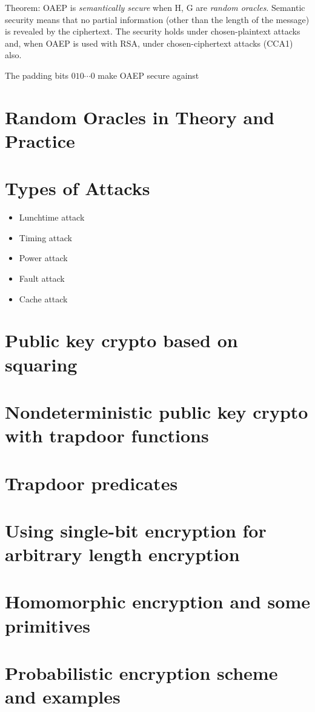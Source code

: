\documentclass[10pt]{article}
\begin{document}
Theorem: OAEP is \textit{semantically secure} when H, G are \textit{random oracles}. Semantic security means that no partial information (other than the length of the message) is revealed by the ciphertext. The security holds under chosen-plaintext attacks and, when OAEP is used with RSA, under chosen-ciphertext attacks (CCA1) also. 

The padding bits $010\cdots 0$ make OAEP secure against 

\section{Random Oracles in Theory and Practice}

\section{Types of Attacks}

\begin{itemize}
	\item Lunchtime attack
	\item Timing attack
	\item Power attack
	\item Fault attack
	\item Cache attack
\end{itemize}

\section{Public key crypto based on squaring}

\section{Nondeterministic public key crypto with trapdoor functions}

\section{Trapdoor predicates}

\section{Using single-bit encryption for arbitrary length encryption}

\section{Homomorphic encryption and some primitives}

\section{Probabilistic encryption scheme and examples}





\nocite{*}


\end{document}

